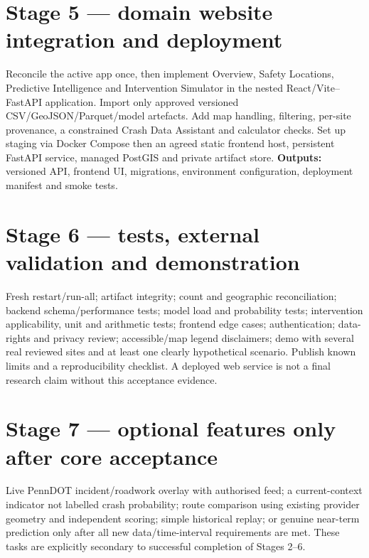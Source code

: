 \documentclass[11pt,a4paper,openany]{report}
\begin{document}
\section{Stage 5 --- domain website integration and deployment}
Reconcile the active app once, then implement Overview, Safety Locations, Predictive Intelligence and Intervention Simulator in the nested React/Vite--FastAPI application. Import only approved versioned CSV/GeoJSON/Parquet/model artefacts. Add map handling, filtering, per-site provenance, a constrained Crash Data Assistant and calculator checks. Set up staging via Docker Compose then an agreed static frontend host, persistent FastAPI service, managed PostGIS and private artifact store. \textbf{Outputs:} versioned API, frontend UI, migrations, environment configuration, deployment manifest and smoke tests.

\section{Stage 6 --- tests, external validation and demonstration}
Fresh restart/run-all; artifact integrity; count and geographic reconciliation; backend schema/performance tests; model load and probability tests; intervention applicability, unit and arithmetic tests; frontend edge cases; authentication; data-rights and privacy review; accessible/map legend disclaimers; demo with several real reviewed sites and at least one clearly hypothetical scenario. Publish known limits and a reproducibility checklist. A deployed web service is not a final research claim without this acceptance evidence.

\section{Stage 7 --- optional features only after core acceptance}
Live PennDOT incident/roadwork overlay with authorised feed; a current-context indicator not labelled crash probability; route comparison using existing provider geometry and independent scoring; simple historical replay; or genuine near-term prediction only after all new data/time-interval requirements are met. These tasks are explicitly secondary to successful completion of Stages 2--6.
\end{document}
